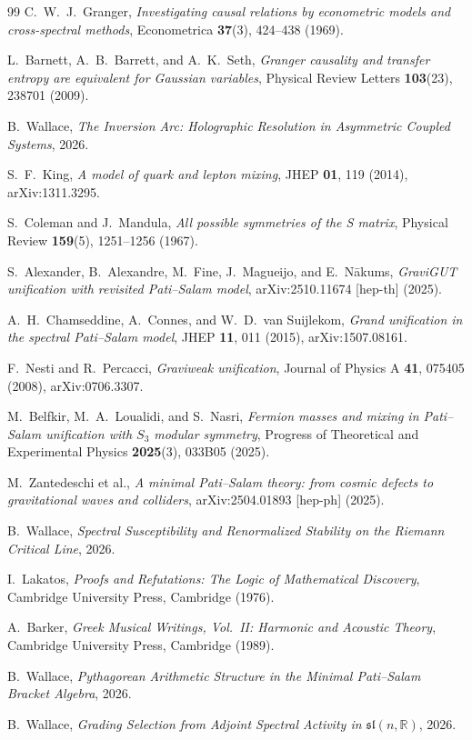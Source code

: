 \documentclass[11pt,a4paper]{article}
\theoremstyle{plain}
\theoremstyle{definition}
\theoremstyle{remark}
\begin{document}
\begin{thebibliography}{99}
C.~W.~J.~Granger,
\textit{Investigating causal relations by econometric models and cross-spectral methods},
Econometrica \textbf{37}(3), 424--438 (1969).

L.~Barnett, A.~B.~Barrett, and A.~K.~Seth,
\textit{Granger causality and transfer entropy are equivalent for Gaussian variables},
Physical Review Letters \textbf{103}(23), 238701 (2009).

B.~Wallace,
\textit{The Inversion Arc: Holographic Resolution in Asymmetric Coupled Systems},
2026.

S.~F.~King, \textit{A model of quark and lepton mixing},
JHEP \textbf{01}, 119 (2014), arXiv:1311.3295.

S.~Coleman and J.~Mandula,
\textit{All possible symmetries of the S matrix},
Physical Review \textbf{159}(5), 1251--1256 (1967).

S.~Alexander, B.~Alexandre, M.~Fine, J.~Magueijo, and E.~N\={a}kums,
\textit{GraviGUT unification with revisited Pati--Salam model},
arXiv:2510.11674 [hep-th] (2025).

A.~H.~Chamseddine, A.~Connes, and W.~D.~van Suijlekom,
\textit{Grand unification in the spectral Pati--Salam model},
JHEP \textbf{11}, 011 (2015), arXiv:1507.08161.

F.~Nesti and R.~Percacci,
\textit{Graviweak unification},
Journal of Physics A \textbf{41}, 075405 (2008), arXiv:0706.3307.

M.~Belfkir, M.~A.~Loualidi, and S.~Nasri,
\textit{Fermion masses and mixing in Pati--Salam unification with $S_3$ modular symmetry},
Progress of Theoretical and Experimental Physics \textbf{2025}(3), 033B05 (2025).

M.~Zantedeschi et al.,
\textit{A minimal Pati--Salam theory: from cosmic defects to gravitational waves and colliders},
arXiv:2504.01893 [hep-ph] (2025).

B.~Wallace,
\textit{Spectral Susceptibility and Renormalized Stability on the Riemann Critical Line},
2026.

I.~Lakatos,
\textit{Proofs and Refutations: The Logic of Mathematical Discovery},
Cambridge University Press, Cambridge (1976).

A.~Barker,
\textit{Greek Musical Writings, Vol.~II: Harmonic and Acoustic Theory},
Cambridge University Press, Cambridge (1989).

B.~Wallace,
\textit{Pythagorean Arithmetic Structure in the Minimal Pati--Salam
Bracket Algebra},
2026.

B.~Wallace,
\textit{Grading Selection from Adjoint Spectral Activity
in $\mathfrak{sl}(n,\mathbb{R})$},
2026.

\end{thebibliography}
\end{document}
